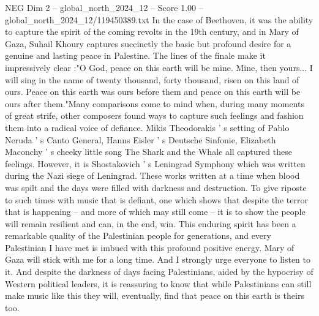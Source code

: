 \begin{textsample}{NEG Dim 2 – global\_north\_2024\_12 – Score 1.00 – global\_north\_2024\_12/119450389.txt}
In the case of Beethoven, it was the ability to capture the spirit of the coming revolts in the 19th century, and in Mary of Gaza, Suhail Khoury captures succinctly the basic but profound desire for a genuine and lasting peace in Palestine.
The lines of the finale make it impressively clear :"O God, peace on this earth will be mine.
Mine, then yours...
I will sing in the name of twenty thousand, forty thousand, risen on this land of ours.
Peace on this earth was ours before them and peace on this earth will be ours after them."Many comparisons come to mind when, during many moments of great strife, other composers found ways to capture such feelings and fashion them into a radical voice of defiance.
Mikis Theodorakis ' s setting of Pablo Neruda ' s Canto General, Hanns Eisler ' s Deutsche Sinfonie, Elizabeth Maconchy ' s cheeky little song The Shark and the Whale all captured these feelings.
However, it is Shostakovich ' s Leningrad Symphony which was written during the Nazi siege of Leningrad.
These works written at a time when blood was spilt and the days were filled with darkness and destruction.
To give riposte to such times with music that is defiant, one which shows that despite the terror that is happening -- and more of which may still come -- it is to show the people will remain resilient and can, in the end, win.
This enduring spirit has been a remarkable quality of the Palestinian people for generations, and every Palestinian I have met is imbued with this profound positive energy.
Mary of Gaza will stick with me for a long time.
And I strongly urge everyone to listen to it.
And despite the darkness of days facing Palestinians, aided by the hypocrisy of Western political leaders, it is reassuring to know that while Palestinians can still make music like this they will, eventually, find that peace on this earth is theirs too.

\end{textsample}
